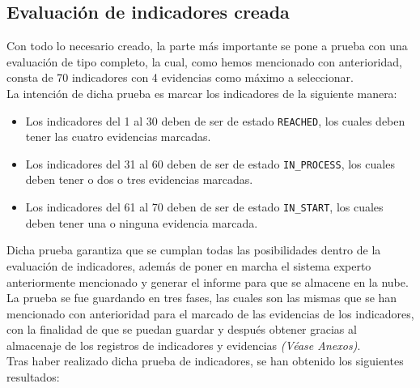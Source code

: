 \subsection{Evaluación de indicadores creada}
Con todo lo necesario creado, la parte más importante se pone a prueba con una
evaluación de tipo completo, la cual, como hemos mencionado con anterioridad,
consta de 70 indicadores con 4 evidencias como máximo a seleccionar.
\\
La intención de dicha prueba es marcar los indicadores de la siguiente manera:
\begin{itemize}
    \item Los indicadores del 1 al 30 deben de ser de estado \texttt{REACHED}, los cuales deben tener las cuatro evidencias marcadas.
    \item Los indicadores del 31 al 60 deben de ser de estado \texttt{IN\_PROCESS}, los cuales deben tener o dos o tres evidencias marcadas.
    \item Los indicadores del 61 al 70 deben de ser de estado \texttt{IN\_START}, los cuales deben tener una o ninguna evidencia marcada.
\end{itemize}
Dicha prueba garantiza que se cumplan todas las posibilidades dentro de la
evaluación de indicadores, además de poner en marcha el sistema experto
anteriormente mencionado y generar el informe para que se almacene en la nube.
\\
La prueba se fue guardando en tres fases, las cuales son las mismas que se han
mencionado con anterioridad para el marcado de las evidencias de los
indicadores, con la finalidad de que se puedan guardar y después obtener gracias
al almacenaje de los registros de indicadores y evidencias \textit{(Véase
Anexos)}.
\\
Tras haber realizado dicha prueba de indicadores, se han obtenido los siguientes resultados:

